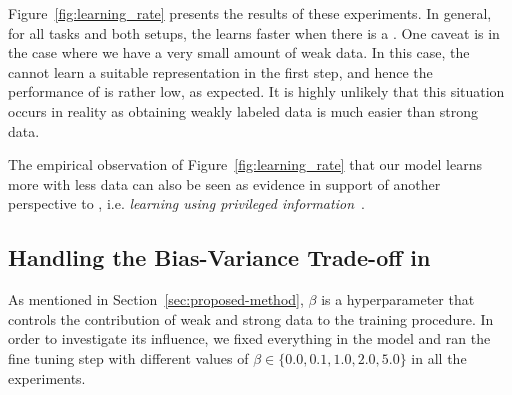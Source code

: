 Figure~\ref{fig:learning_rate} presents the results of these experiments. In general, for all tasks and both setups, the \std learns faster when there is a \tch.
One caveat is in the case where we have a very small amount of weak data. In this case, the \std cannot learn a suitable representation in the first step, and hence the performance of \fwl is rather low, as expected. It is highly unlikely that this situation occurs in reality as obtaining weakly labeled data is much easier than strong data.

The empirical observation of Figure~\ref{fig:learning_rate} that our model learns more with less data can also be seen as evidence in support of another perspective to \fwl, i.e. \emph{learning using privileged information}~\citep{vapnik2015learning}. 


\subsection{Handling the Bias-Variance Trade-off in \fwl}
\label{sec:bias-variance}
As mentioned in Section~\ref{sec:proposed-method}, $\beta$ is a hyperparameter that controls the contribution of weak and strong data to the training procedure. In order to investigate its influence, we fixed everything in the model and ran the fine tuning step with different values of $\beta \in \{0.0, 0.1, 1.0, 2.0, 5.0\}$ in all the experiments.

